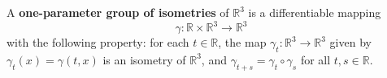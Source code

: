 A \textbf{one-parameter group of isometries} of $\mathbb{R}^3$ is a differentiable mapping
$$\gamma: \mathbb{R} \times \mathbb{R}^3 \rightarrow \mathbb{R}^3$$
with the following property: for each $t \in \mathbb{R}$, the map $\gamma_t: \mathbb{R}^3 \rightarrow \mathbb{R}^3$ given by $\gamma_t(x) = \gamma(t, x)$ is an isometry of $\mathbb{R}^3$, and $\gamma_{t+s} = \gamma_t \circ \gamma_s$ for all $t, s \in \mathbb{R}$.
